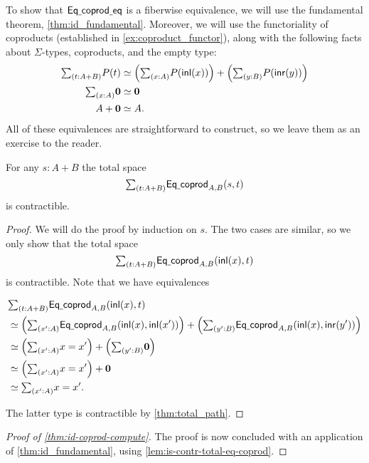 To show that $\mathsf{Eq\underline{\ }{}coprod\underline{\ }{}eq}$ is a fiberwise equivalence, we will use the fundamental theorem, \cref{thm:id_fundamental}. Moreover, we will use the functoriality of coproducts (established in \cref{ex:coproduct_functor}), along with the following facts about $\Sigma$-types, coproducts, and the empty type:
\begin{align*}
\sm{t:A+B}P(t) & \eqvsym \Big(\sm{x:A}P(\inl(x))\Big)+\Big(\sm{y:B}P(\inr(y))\Big)\\
\sm{x:A}\emptyt & \eqvsym \emptyt \\
A+\emptyt & \eqvsym A.
\end{align*}
All of these equivalences are straightforward to construct, so we leave them as an exercise to the reader. 

\begin{lem}\label{lem:is-contr-total-eq-coprod}
For any $s:A+B$ the total space
\begin{equation*}
\sm{t:A+B}\mathsf{Eq\usc{}coprod}_{A,B}(s,t)
\end{equation*}
is contractible.
\end{lem}

\begin{proof}
We will do the proof by induction on $s$. The two cases are similar, so we only show that the total space
\begin{equation*}
\sm{t:A+B}\mathsf{Eq\usc{}coprod}_{A,B}(\inl(x),t)
\end{equation*}
is contractible. Note that we have equivalences
\begin{samepage}
\begin{align*}
& \sm{t:A+B}\mathsf{Eq\usc{}coprod}_{A,B}(\inl(x),t) \\
& \eqvsym \Big(\sm{x':A}\mathsf{Eq\usc{}coprod}_{A,B}(\inl(x),\inl(x'))\Big)+\Big(\sm{y':B}\mathsf{Eq\usc{}coprod}_{A,B}(\inl(x),\inr(y'))\Big) \\
& \eqvsym \Big(\sm{x':A}x=x'\Big)+\Big(\sm{y':B}\emptyt\Big) \\
& \eqvsym \Big(\sm{x':A}x=x'\Big)+\emptyt \\
& \eqvsym \sm{x':A}x=x'.
\end{align*}%
\end{samepage}%
The latter type is contractible by \cref{thm:total_path}.
\end{proof}

\begin{proof}[Proof of \cref{thm:id-coprod-compute}]
The proof is now concluded with an application of \cref{thm:id_fundamental}, using \cref{lem:is-contr-total-eq-coprod}.
\end{proof}

